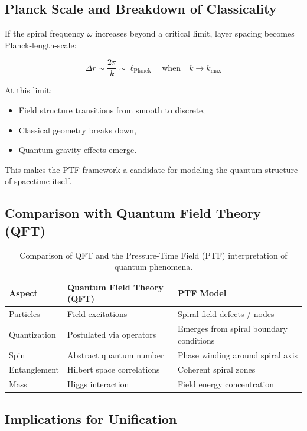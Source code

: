 \documentclass[a4paper,12pt]{article}
\begin{document}
\subsection{Planck Scale and Breakdown of Classicality}

If the spiral frequency \(\omega\) increases beyond a critical limit, layer spacing becomes Planck-length-scale:

\[
\Delta r \sim \frac{2\pi}{k} \sim \ell_{\text{Planck}} \quad \text{when} \quad k \to k_{\text{max}}
\]

At this limit:
\begin{itemize}
    \item Field structure transitions from smooth to discrete,
    \item Classical geometry breaks down,
    \item Quantum gravity effects emerge.
\end{itemize}

This makes the PTF framework a candidate for modeling the quantum structure of spacetime itself.

\subsection{Comparison with Quantum Field Theory (QFT)}

\begin{table}[H]
\centering
\begin{tabular}{|l|p{5cm}|p{5cm}|}
\hline
\textbf{Aspect} & \textbf{Quantum Field Theory (QFT)} & \textbf{PTF Model} \\
\hline
Particles & Field excitations & Spiral field defects / nodes \\
Quantization & Postulated via operators & Emerges from spiral boundary conditions \\
Spin & Abstract quantum number & Phase winding around spiral axis \\
Entanglement & Hilbert space correlations & Coherent spiral zones \\
Mass & Higgs interaction & Field energy concentration \\
\hline
\end{tabular}
\caption{Comparison of QFT and the Pressure-Time Field (PTF) interpretation of quantum phenomena.}
\end{table}

\subsection{Implications for Unification}
\end{document}
